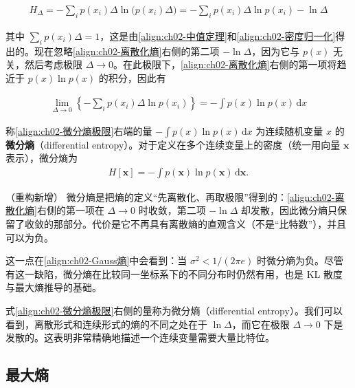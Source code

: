 \documentclass[../../main.tex]{subfiles}
\begin{document}
\begin{align}
  H_{\Delta} = -\sum_i p(x_i)\Delta\ln\big(p(x_i)\Delta\big) = -\sum_i p(x_i)\Delta\ln p(x_i) - \ln\Delta
  \label{align:ch02-离散化熵}
\end{align}

其中 $\sum_ip(x_i)\Delta=1$，这是由\eqref{align:ch02-中值定理}和\eqref{align:ch02-密度归一化}得出的。现在忽略\eqref{align:ch02-离散化熵}右侧的第二项 $-\ln\Delta$，因为它与 $p(x)$ 无关，然后考虑极限 $\Delta\to0$。在此极限下，\eqref{align:ch02-离散化熵}右侧的第一项将趋近于 $p(x)\ln p(x)$ 的积分，因此有

\begin{align}
  \lim_{\Delta\to0}\left\{-\sum_i p(x_i)\Delta\ln p(x_i)\right\} = -\int p(x)\ln p(x)\,\mathrm{d}x
  \label{align:ch02-微分熵极限}
\end{align}

\begin{definition}[微分熵]\label{definition:ch02-微分熵}
称\eqref{align:ch02-微分熵极限}右端的量 $-\int p(x)\ln p(x)\,\mathrm{d}x$ 为连续随机变量 $x$ 的\textbf{微分熵}（differential entropy）。对于定义在多个连续变量上的密度（统一用向量 $\mathbf{x}$ 表示），微分熵为
\begin{align*}
  H[\mathbf{x}] = -\int p(\mathbf{x})\ln p(\mathbf{x})\,\mathrm{d}\mathbf{x} .
\end{align*}
\end{definition}

\begin{remark}（重构新增）
微分熵是把熵的定义“先离散化、再取极限”得到的：\eqref{align:ch02-离散化熵}右侧的第一项在 $\Delta\to0$ 时收敛，第二项 $-\ln\Delta$ 却发散，因此微分熵只保留了收敛的那部分。代价是它不再具有离散熵的直观含义（不是“比特数”），并且可以为负。

这一点在\eqref{align:ch02-Gauss熵}中会看到：当 $\sigma^{2}<1/(2\pi e)$ 时微分熵为负。尽管有这一缺陷，微分熵在比较同一坐标系下的不同分布时仍然有用，也是 KL 散度与最大熵推导的基础。
\end{remark}

式\eqref{align:ch02-微分熵极限}右侧的量称为微分熵（differential entropy）。我们可以看到，离散形式和连续形式的熵的不同之处在于 $\ln\Delta$，而它在极限 $\Delta\to0$ 下是发散的。这表明非常精确地描述一个连续变量需要大量比特位。

\subsection{最大熵}\label{subsection:ch02-最大熵}
\end{document}
